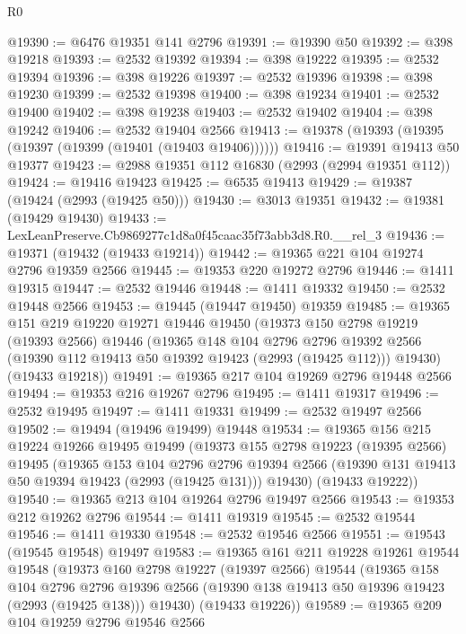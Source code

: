 \begin{lexlean}{R0}
\begin{coremodule}
@19390 := @6476 @19351 @141 @2796
@19391 := @19390 @50
@19392 := @398 @19218
@19393 := @2532 @19392
@19394 := @398 @19222
@19395 := @2532 @19394
@19396 := @398 @19226
@19397 := @2532 @19396
@19398 := @398 @19230
@19399 := @2532 @19398
@19400 := @398 @19234
@19401 := @2532 @19400
@19402 := @398 @19238
@19403 := @2532 @19402
@19404 := @398 @19242
@19406 := @2532 @19404 @2566
@19413 := @19378 (@19393 (@19395 (@19397 (@19399 (@19401 (@19403 @19406))))))
@19416 := @19391 @19413 @50 @19377
@19423 := @2988 @19351 @112 @16830 (@2993 (@2994 @19351 @112))
@19424 := @19416 @19423
@19425 := @6535 @19413
@19429 := @19387 (@19424 (@2993 (@19425 @50)))
@19430 := @3013 @19351
@19432 := @19381 (@19429 @19430)
@19433 := LexLeanPreserve.Cb9869277c1d8a0f45caac35f73abb3d8.R0.__rel_3
@19436 := @19371 (@19432 (@19433 @19214))
@19442 := @19365 @221 @104 @19274 @2796 @19359 @2566
@19445 := @19353 @220 @19272 @2796
@19446 := @1411 @19315
@19447 := @2532 @19446
@19448 := @1411 @19332
@19450 := @2532 @19448 @2566
@19453 := @19445 (@19447 @19450) @19359
@19485 := @19365
    @151
    @219
    @19220
    @19271
    @19446
    @19450
    (@19373
      @150
      @2798
      @19219
      (@19393 @2566)
      @19446
      (@19365
        @148
        @104
        @2796
        @2796
        @19392
        @2566
        (@19390 @112 @19413 @50 @19392 @19423 (@2993 (@19425 @112)))
        @19430)
      (@19433 @19218))
@19491 := @19365 @217 @104 @19269 @2796 @19448 @2566
@19494 := @19353 @216 @19267 @2796
@19495 := @1411 @19317
@19496 := @2532 @19495
@19497 := @1411 @19331
@19499 := @2532 @19497 @2566
@19502 := @19494 (@19496 @19499) @19448
@19534 := @19365
    @156
    @215
    @19224
    @19266
    @19495
    @19499
    (@19373
      @155
      @2798
      @19223
      (@19395 @2566)
      @19495
      (@19365
        @153
        @104
        @2796
        @2796
        @19394
        @2566
        (@19390 @131 @19413 @50 @19394 @19423 (@2993 (@19425 @131)))
        @19430)
      (@19433 @19222))
@19540 := @19365 @213 @104 @19264 @2796 @19497 @2566
@19543 := @19353 @212 @19262 @2796
@19544 := @1411 @19319
@19545 := @2532 @19544
@19546 := @1411 @19330
@19548 := @2532 @19546 @2566
@19551 := @19543 (@19545 @19548) @19497
@19583 := @19365
    @161
    @211
    @19228
    @19261
    @19544
    @19548
    (@19373
      @160
      @2798
      @19227
      (@19397 @2566)
      @19544
      (@19365
        @158
        @104
        @2796
        @2796
        @19396
        @2566
        (@19390 @138 @19413 @50 @19396 @19423 (@2993 (@19425 @138)))
        @19430)
      (@19433 @19226))
@19589 := @19365 @209 @104 @19259 @2796 @19546 @2566

\end{coremodule}
\end{lexlean}
